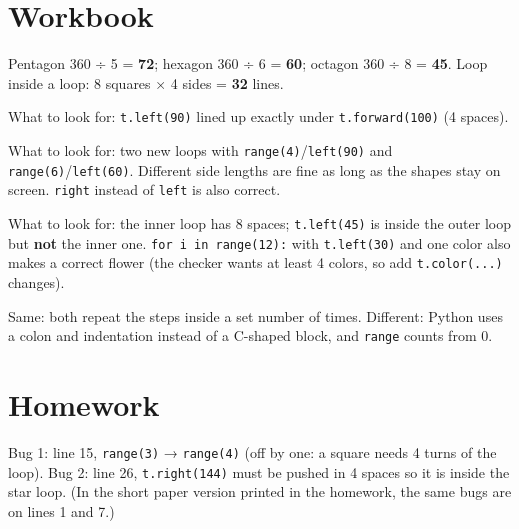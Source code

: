 
\section{Workbook}
\begin{answer}
Pentagon 360 ÷ 5 = \textbf{72}; hexagon 360 ÷ 6 = \textbf{60}; octagon 360 ÷ 8 = \textbf{45}.
Loop inside a loop: 8 squares × 4 sides = \textbf{32} lines.
\end{answer}

\begin{answer}
What to look for: \texttt{t.left(90)} lined up exactly under \texttt{t.forward(100)} (4 spaces).
\end{answer}

\begin{answer}
What to look for: two new loops with \texttt{range(4)}/\texttt{left(90)} and \texttt{range(6)}/\texttt{left(60)}. Different side lengths are fine as long as the shapes stay on screen. \texttt{right} instead of \texttt{left} is also correct.
\end{answer}

\begin{answer}
What to look for: the inner loop has 8 spaces; \texttt{t.left(45)} is inside the outer loop but \textbf{not} the inner one. \texttt{for i in range(12):} with \texttt{t.left(30)} and one color also makes a correct flower (the checker wants at least 4 colors, so add \texttt{t.color(...)} changes).
\end{answer}

\begin{answer}[Reflection]
Same: both repeat the steps inside a set number of times. Different: Python uses a colon and indentation instead of a C-shaped block, and \texttt{range} counts from 0.
\end{answer}

\section{Homework}
\begin{answer}
Bug 1: line 15, \texttt{range(3)} → \texttt{range(4)} (off by one: a square needs 4 turns of the loop). Bug 2: line 26, \texttt{t.right(144)} must be pushed in 4 spaces so it is inside the star loop. (In the short paper version printed in the homework, the same bugs are on lines 1 and 7.)
\end{answer}

